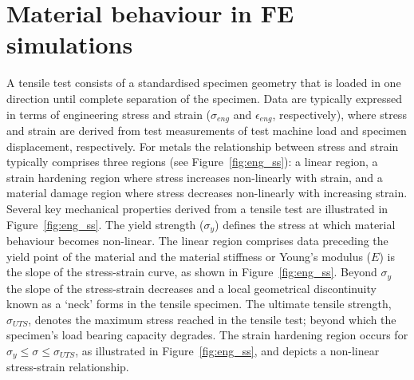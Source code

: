 \documentclass[preprint, review, 12pt]{elsarticle}
\begin{document}
	\section{Material behaviour in FE simulations}
	\label{h:general_material_behaviour}

	A tensile test consists of a standardised specimen geometry that is loaded in one direction until complete separation of the specimen.
	Data are typically expressed in terms of engineering stress and strain ($\sigma_{eng}$ and $\epsilon_{eng}$, respectively), where stress and strain are derived from test measurements of test machine load and specimen displacement, respectively.
	For metals the relationship between stress and strain typically comprises three regions (see Figure~\ref{fig:eng_ss}): a linear region, a strain hardening region where stress increases non-linearly with strain, and a material damage region where stress decreases non-linearly with increasing strain.
	Several key mechanical properties derived from a tensile test are illustrated in Figure~\ref{fig:eng_ss}.
	The yield strength ($\sigma_y$) defines the stress at which material behaviour becomes non-linear.
	The linear region comprises data preceding the yield point of the material and the material stiffness or Young's modulus ($E$) is the slope of the stress-strain curve, as shown in Figure~\ref{fig:eng_ss}.
	Beyond $\sigma_y$ the slope of the stress-strain decreases and a local geometrical discontinuity known as a `neck' forms in the tensile specimen.
	The ultimate tensile strength, $\sigma_{UTS}$, denotes the maximum stress reached in the tensile test; beyond which the specimen's load bearing capacity degrades.
	The strain hardening region occurs for $\sigma_y \leq \sigma \leq \sigma_{UTS}$, as illustrated in Figure~\ref{fig:eng_ss}, and depicts a non-linear stress-strain relationship.
\end{document}
